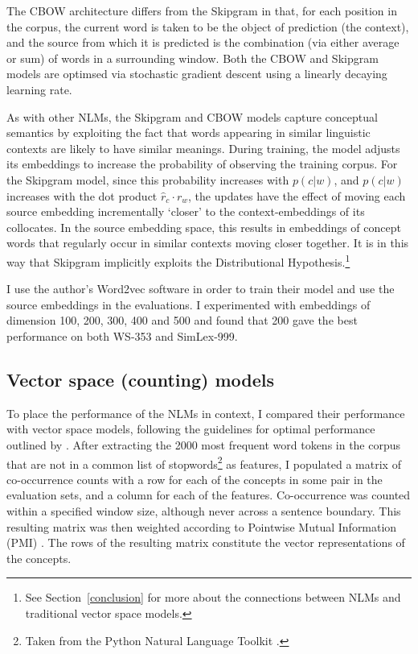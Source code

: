 The CBOW architecture differs from the Skipgram in that, for each position in the corpus, the current word is taken to be the object of prediction (the context), and the source from which it is predicted is the combination (via either average or sum) of words in a surrounding window. Both the CBOW and Skipgram models are optimsed via stochastic gradient descent using a linearly decaying learning rate. 

As with other NLMs, the Skipgram and CBOW models capture conceptual semantics by exploiting the fact that words appearing in similar linguistic contexts are likely to have similar meanings. During training, the model adjusts its embeddings to increase the probability of observing the training corpus. For the Skipgram model, since this probability increases with \(p(c|w)\), and \(p(c|w)\) increases with the dot product \( \hat{r}_c\cdot r_{w} \), the updates have the effect of moving each source embedding incrementally `closer' to the context-embeddings of its collocates. In the source embedding space, this results in embeddings of concept words that regularly occur in similar contexts moving closer together. It is in this way that Skipgram implicitly exploits the Distributional Hypothesis.\footnote{See Section~\ref{conclusion} for more about the connections between NLMs and traditional vector space models.}

I use the author's Word2vec software in order to train their model and use the source embeddings in the evaluations. I experimented with embeddings of dimension 100, 200, 300, 400 and 500 and found that 200 gave the best performance on both WS-353 and SimLex-999. 

\subsection{\bf Vector space (counting) models}

To place the performance of the NLMs in context, I compared their performance with vector space models, following the guidelines for optimal performance outlined by \cite{kiela2014systematic}. After extracting the 2000 most frequent word tokens in the corpus that are not in a common list of stopwords\footnote{Taken from the Python Natural Language Toolkit \citep{bird2006nltk}.} as features, I populated a matrix of co-occurrence counts with a row for each of the concepts in some pair in the evaluation sets, and a column for each of the features. Co-occurrence was counted within a specified window size, although never across a sentence boundary. This resulting matrix was then weighted according to Pointwise Mutual Information (PMI) \citep{recchia2009more}. The rows of the resulting matrix constitute the vector representations of the concepts.   

